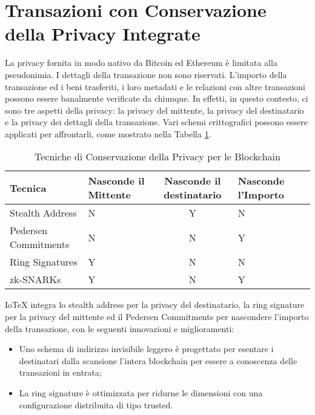 \section{Transazioni con Conservazione della Privacy Integrate}
La privacy fornita in modo nativo da Bitcoin ed Ethereum è limitata alla pseudonimia. I dettagli della transazione non sono riservati. L'importo della transazione ed i beni trasferiti, i loro metadati e le relazioni con altre transazioni possono essere banalmente verificate da chiunque. In effetti, in questo contesto, ci sono tre aspetti della privacy: la privacy del mittente, la privacy del destinatario e la privacy dei dettagli della transazione. Vari schemi crittografici possono essere applicati per affrontarli, come mostrato nella Tabella \ref{table:PrivacyPreservingTechniques}.

\begin{table}[tp]%
	\caption{Tecniche di Conservazione della Privacy per le Blockchain}
	\label{table:PrivacyPreservingTechniques}\centering %
	\begin{tabular}{l|p{2cm}c|p{2.5cm}|p{2cm}}
		\hline
		Tecnica              & Nasconde il Mittente & Nasconde il destinatario & Nasconde l'Importo \\
		\hline
		Stealth Address      & N                    & Y                         & N                  \\
		Pedersen Commitments & N                    & N                         & Y                  \\
		Ring Signatures      & Y                    & N                         & N                  \\
		zk-SNARKs            & Y                    & N                         & Y                  \\
		\hline
	\end{tabular}
\end{table}

IoTeX integra lo stealth address per la privacy del destinatario, la ring signature per la privacy del mittente ed il Pedersen Commitments per nascondere l'importo della transazione, con le seguenti innovazioni e miglioramenti:

\begin{itemize}
	\item Uno schema di indirizzo invisibile leggero è progettato per esentare i destinatari dalla scansione
	      l'intera blockchain per essere a conoscenza delle transazioni in entrata;

	\item La ring signature è ottimizzata per ridurne le dimensioni con una configurazione distribuita di tipo trusted.
\end{itemize}


